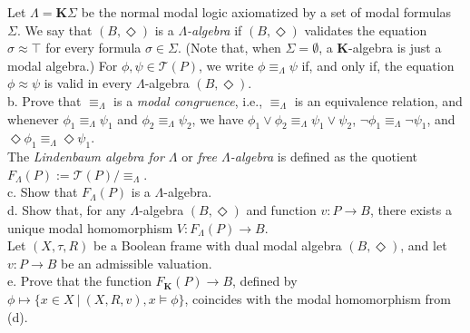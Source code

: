 Let $\Lambda = \mathbf{K}\Sigma$ be the normal modal logic axiomatized by a set of modal formulas $\Sigma$. We say that $(B, \Diamond)$ is a \emph{$\Lambda$-algebra} if $(B,\Diamond)$ validates the equation $\sigma \approx \top$ for every formula $\sigma \in \Sigma$. (Note that, when $\Sigma = \emptyset$, a $\mathbf{K}$-algebra is just a modal algebra.) For $\phi, \psi \in \mathcal{T}(P)$, we write $\phi \equiv_\Lambda \psi$ if, and only if, the equation $\phi \approx \psi$ is valid in every $\Lambda$-algebra $(B,\Diamond)$.\\

b. Prove that $\equiv_{\Lambda}$ is a \emph{modal congruence}, i.e., $\equiv_{\Lambda}$ is an equivalence relation, and whenever $\phi_1 \equiv_{\Lambda} \psi_1$ and $\phi_2 \equiv_{\Lambda} \psi_2$, we have $\phi_1 \vee \phi_2 \equiv_{\Lambda} \psi_1 \vee \psi_2$, $\neg\phi_1 \equiv_{\Lambda} \neg\psi_1$, and $\Diamond\phi_1 \equiv_{\Lambda} \Diamond\psi_1$.\\

The \emph{Lindenbaum algebra for $\Lambda$} or \emph{free $\Lambda$-algebra} is defined as the quotient $F_{\Lambda}(P) := \mathcal{T}(P)/{\equiv_\Lambda}$.\\

c. Show that $F_{\Lambda}(P)$ is a $\Lambda$-algebra.\\

d. Show that, for any $\Lambda$-algebra $(B,\Diamond)$ and function $v \colon P \to B$, there exists a unique modal homomorphism $V \colon F_{\Lambda}(P) \to B$.\\

Let $(X,\tau,R)$ be a Boolean frame with dual modal algebra $(B,\Diamond)$, and let $v \colon P \to B$ be an admissible valuation.\\ %

e. Prove that the function $F_{\mathbf{K}}(P) \to B$, defined by $\phi \mapsto \{x \in X \ | \ (X,R,v), x \models \phi\}$, coincides with the modal homomorphism from (d).



